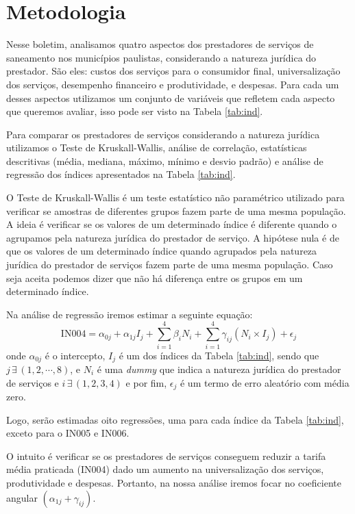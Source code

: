 
\section{Metodologia}\label{s:metod}


\begin{multicols}{2}
Nesse boletim, analisamos quatro aspectos dos prestadores de serviços de saneamento nos municípios paulistas, considerando a natureza jurídica do prestador. São eles: custos dos serviços para o consumidor final, universalização dos serviços, desempenho financeiro e produtividade, e despesas. Para cada um desses aspectos utilizamos um conjunto de variáveis que refletem cada aspecto que queremos avaliar, isso pode ser visto na Tabela \ref{tab:ind}.
\end{multicols}




\begin{multicols}{2}
Para comparar os prestadores de serviços considerando a natureza jurídica utilizamos o Teste de Kruskall-Wallis,  análise de correlação, estatísticas descritivas (média, mediana, máximo, mínimo e desvio padrão) e análise de regressão dos índices apresentados na Tabela \ref{tab:ind}.

O  Teste de Kruskall-Wallis é um teste estatístico não paramétrico utilizado para verificar se amostras de diferentes grupos fazem parte de uma mesma população.
A ideia é verificar se os valores de um determinado índice é diferente quando o agrupamos pela natureza jurídica do prestador de serviço. A hipótese nula é de que os valores de um determinado índice quando agrupados pela natureza jurídica do prestador de serviços fazem parte de uma mesma população. Caso seja aceita podemos dizer que não há diferença entre os grupos em um determinado índice.

Na análise de regressão iremos estimar a seguinte equação:
\begin{equation}\label{eq:reg1}
	\text{IN004} = \alpha_{0j} +
	 \alpha_{1j} I_{j} +
	 \sum_{i=1}^{4} \beta_i N_i + 
	 \sum_{i=1}^{4} \gamma_{ij} (N_i \times I_j) +
	 \epsilon_j
\end{equation}
onde $\alpha_{0j}$ é o intercepto, $I_j$ é um dos índices da Tabela \ref{tab:ind}, sendo que $j \, \exists \, (1, 2, \cdots, 8)$, e $N_i$ é uma \textit{dummy} que indica a natureza jurídica do prestador de serviços e $i \, \exists \, (1, 2, 3, 4)$ e por fim, $\epsilon_j$ é um termo de erro aleatório com média zero.


Logo, serão estimadas oito regressões, uma para cada índice da Tabela \ref{tab:ind}, exceto para o IN005 e IN006. 

O intuito é verificar se os prestadores de serviços conseguem reduzir a tarifa média praticada (IN004) dado um aumento na universalização dos serviços, produtividade e despesas. Portanto, na nossa análise iremos focar no coeficiente angular $(\alpha_{1j} + \gamma_{ij})$. 

\end{multicols}











